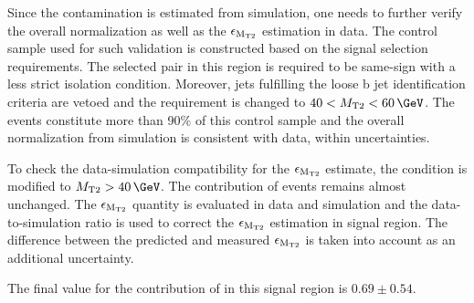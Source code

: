 Since the \wjets contamination is estimated from simulation, one needs to further verify the overall normalization as well as the $\epsilon_{\rm M_{T2}}$ estimation in data. The control sample used for such validation is constructed based on the \muTau signal selection requirements. The selected \muTau pair in this region is required to be same-sign with a less strict \Tau isolation condition. Moreover, jets fulfilling the loose b jet identification criteria are vetoed and the \mttwo requirement is changed to $40<\mttwo<60\,\GeV$. The \wjets events constitute more than 90\% of this control sample and the overall normalization from simulation is consistent with data, within uncertainties.

To check the data-simulation compatibility for the $\epsilon_{\rm M_{T2}}$ estimate, the \mttwo condition is modified to $\mttwo>40\,\GeV$. The contribution of \wjets events remains almost unchanged. The $\epsilon_{\rm M_{T2}}$ quantity is evaluated in data and simulation and the data-to-simulation ratio is used to correct the $\epsilon_{\rm M_{T2}}$ estimation in signal region. The difference between the predicted and measured $\epsilon_{\rm M_{T2}}$ is taken into account as an additional uncertainty. 

The final value for the contribution of \wjets in this signal region is $0.69\pm0.54$.

